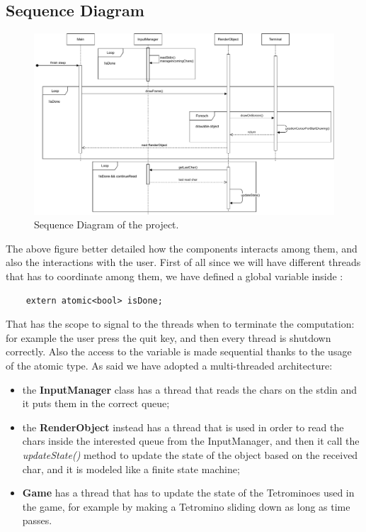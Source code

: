 \documentclass{article}
\begin{document}
\subsection{Sequence Diagram}
\begin{figure}[H]
    \centering
    \includegraphics[width=\linewidth]{img/SequenceDiagram.pdf}
    \caption{Sequence Diagram of the project.}
    \label{fig:sequence}
\end{figure}
The above figure better detailed how the components interacts among them, and also the interactions with the user.
First of all since we will have different threads that has to coordinate among them, we have defined a global variable inside :
\begin{verbatim}
    extern atomic<bool> isDone;
\end{verbatim}
That has the scope to signal to the threads when to terminate the computation: for example the user press the quit key, and then every thread is shutdown correctly. Also the access to the variable is made sequential thanks to the usage of the atomic type.
As said we have adopted a multi-threaded architecture:
\begin{itemize}
    \item the \textbf{InputManager} class has a thread that reads the chars on the stdin and it puts them in the correct queue;
    \item the \textbf{RenderObject} instead has a thread that is used in order to read the chars inside the interested queue from the InputManager, and then it call the \textit{updateState()} method to update the state of the object based on the received char, and it is modeled like a finite state machine;
    \item \textbf{Game} has a thread that has to update the state of the Tetrominoes used in the game, for example by making a Tetromino sliding down as long as time passes.
\end{itemize}
\end{document}
